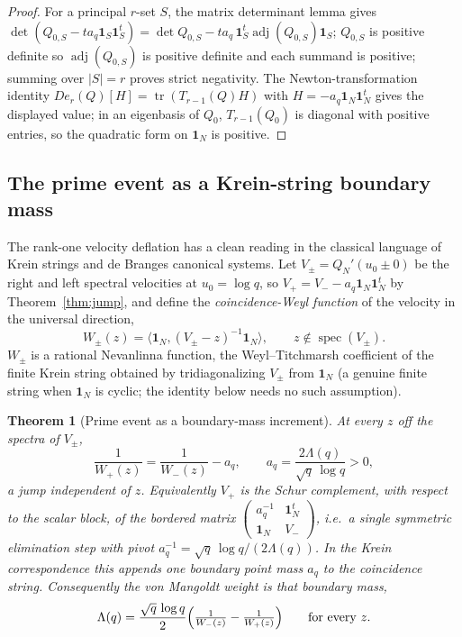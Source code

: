 \documentclass[11pt]{article}
\theoremstyle{plain}
\newtheorem{theorem}{Theorem}[section]
\theoremstyle{definition}
\theoremstyle{remark}
\newcommand{\one}{\mathbf 1}
\newcommand{\adj}{\operatorname{adj}}
\newcommand{\Lam}{\Lambda}
\begin{document}
\begin{proof}
For a principal $r$-set $S$, the matrix determinant lemma gives
$\det(Q_{0,S}-ta_q\one_S\one_S^t)=\det Q_{0,S}-ta_q\,\one_S^t\adj(Q_{0,S})\one_S$;
$Q_{0,S}$ is positive definite so $\adj(Q_{0,S})$ is positive definite and each
summand is positive; summing over $|S|=r$ proves strict negativity. The
Newton-transformation identity $De_r(Q)[H]=\operatorname{tr}(T_{r-1}(Q)H)$ with
$H=-a_q\one_N\one_N^t$ gives the displayed value; in an eigenbasis of $Q_0$,
$T_{r-1}(Q_0)$ is diagonal with positive entries, so the quadratic form on
$\one_N$ is positive.
\end{proof}

\subsection*{The prime event as a Krein-string boundary mass}

The rank-one velocity deflation has a clean reading in the classical language of
Krein strings and de Branges canonical systems. Let $V_\pm=Q_N'(u_0\pm0)$ be the
right and left spectral velocities at $u_0=\log q$, so $V_+=V_--a_q\one_N\one_N^t$
by Theorem~\ref{thm:jump}, and define the \emph{coincidence-Weyl function} of the
velocity in the universal direction,
\[
        W_\pm(z)=\bigl\langle\one_N,(V_\pm-z)^{-1}\one_N\bigr\rangle,
        \qquad z\notin\operatorname{spec}(V_\pm).
\]
$W_\pm$ is a rational Nevanlinna function, the
Weyl--Titchmarsh coefficient of the finite Krein string obtained by
tridiagonalizing $V_\pm$ from $\one_N$ (a genuine finite string when $\one_N$ is
cyclic; the identity below needs no such assumption).

\begin{theorem}[Prime event as a boundary-mass increment]\label{thm:krein}
At every $z$ off the spectra of $V_\pm$,
\[
        \frac{1}{W_+(z)}=\frac{1}{W_-(z)}-a_q,
        \qquad a_q=\frac{2\Lam(q)}{\sqrt q\,\log q}>0,
\]
a jump \emph{independent of $z$}. Equivalently $V_+$ is the Schur complement, with
respect to the scalar block, of the bordered matrix
$\left(\begin{smallmatrix}a_q^{-1}&\one_N^t\\ \one_N&V_-\end{smallmatrix}\right)$,
i.e.\ a single symmetric elimination step with pivot $a_q^{-1}=\sqrt q\,\log q/
(2\Lam(q))$. In the Krein correspondence this appends one boundary point mass
$a_q$ to the coincidence string. Consequently the von Mangoldt weight is that
boundary mass,
\[
        \Lam(q)=\frac{\sqrt q\,\log q}{2}\Bigl(\tfrac{1}{W_-(z)}-\tfrac{1}{W_+(z)}\Bigr)
        \qquad\text{for every }z.
\]
\end{theorem}
\end{document}
